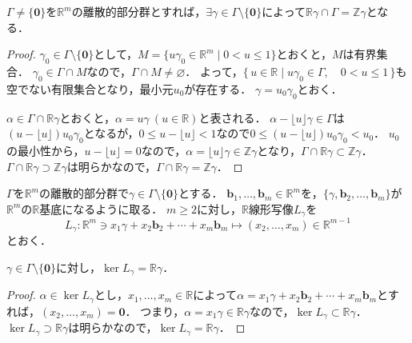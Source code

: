 \begin{screen}
  \begin{lem}
    \label{discrete_subgroup_lemma_2}
    $\Gamma\neq\{\boldsymbol{0}\}$を$\mathbb{R}^m$の離散的部分群とすれば，$\exists\gamma\in\Gamma\setminus\{\boldsymbol{0}\}$によって$\mathbb{R}\gamma\cap\Gamma=\mathbb{Z}\gamma$となる．
  \end{lem}
\end{screen}
\begin{proof}
  $\gamma_0\in\Gamma\setminus\{\boldsymbol{0}\}$として，$M=\{u\gamma_0\in\mathbb{R}^m\mid0< u\leq1\}$とおくと，$M$は有界集合．
  $\gamma_0\in\Gamma\cap M$なので，$\Gamma\cap M\neq\varnothing$．
  よって，$\{\,u\in\mathbb{R}\mid u\gamma_0\in\Gamma,\quad 0< u\leq1\,\}$も空でない有限集合となり，最小元$u_0$が存在する．
  $\gamma=u_0\gamma_0$とおく．

  $\alpha\in\Gamma\cap\mathbb{R}\gamma$とおくと，$\alpha=u\gamma\ (u\in\mathbb{R})$と表される．
  $\alpha-\lfloor u\rfloor\gamma\in\Gamma$は$(u-\lfloor u\rfloor)u_0\gamma_0$となるが，$0\leq u-\lfloor u\rfloor< 1$なので$0\leq(u-\lfloor u\rfloor)u_0\gamma_0< u_0$．
  $u_0$の最小性から，$u-\lfloor u\rfloor=0$なので，$\alpha=\lfloor u\rfloor\gamma\in\mathbb{Z}\gamma$となり，$\Gamma\cap\mathbb{R}\gamma\subset\mathbb{Z}\gamma$．
  $\Gamma\cap\mathbb{R}\gamma\supset\mathbb{Z}\gamma$は明らかなので，$\Gamma\cap\mathbb{R}\gamma=\mathbb{Z}\gamma$．
\end{proof}


$\Gamma$を$\mathbb{R}^m$の離散的部分群で$\gamma\in\Gamma\setminus\{\boldsymbol{0}\}$とする．
$\boldsymbol{b}_1,\ldots,\boldsymbol{b}_m\in\mathbb{R}^m$を，$\{\gamma,\boldsymbol{b}_2,\ldots,\boldsymbol{b}_m\}$が$\mathbb{R}^m$の$\mathbb{R}$基底になるように取る．
$m\geq2$に対し，$\mathbb{R}$線形写像$L_\gamma$を
\[L_\gamma\colon\mathbb{R}^m\ni x_1\gamma+x_2\boldsymbol{b}_2+\cdots+x_m\boldsymbol{b}_m\mapsto(x_2,\ldots,x_m)\in\mathbb{R}^{m-1}\]
とおく．

\begin{screen}
  \begin{lem}
    \label{discrete_subgroup_lemma_3}
    $\gamma\in\Gamma\setminus\{\boldsymbol{0}\}$に対し，$\ker L_\gamma=\mathbb{R}\gamma$．
  \end{lem}
\end{screen}
\begin{proof}
  $\alpha\in\ker L_\gamma$とし，$x_1,\ldots,x_m\in\mathbb{R}$によって$\alpha=x_1\gamma+x_2\boldsymbol{b}_2+\cdots+x_m\boldsymbol{b}_m$とすれば，$(x_2,\ldots,x_m)=\boldsymbol{0}$．
  つまり，$\alpha=x_1\gamma\in\mathbb{R}\gamma$なので，$\ker L_\gamma\subset\mathbb{R}\gamma$．
  $\ker L_\gamma\supset\mathbb{R}\gamma$は明らかなので，$\ker L_\gamma=\mathbb{R}\gamma$．
\end{proof}

